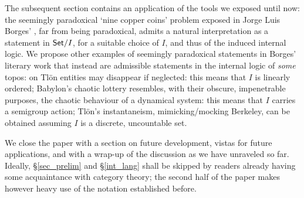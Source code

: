 The subsequent section contains an application of the tools we exposed until now: the seemingly paradoxical `nine copper coins' problem exposed in Jorge Luis Borges' \cite{Borges1963}, far from being paradoxical, admits a natural interpretation as a statement in $\mathsf{Set}/I$, for a suitable choice of $I$, and thus of the induced internal logic. We propose other examples of seemingly paradoxical statements in Borges' literary work that instead are admissible statements in the internal logic of \emph{some} topos: on Tl\"on entities may disappear if neglected: this means that $I$ is linearly ordered; Babylon's chaotic lottery resembles, with their obscure, impenetrable purposes, the chaotic behaviour of a dynamical system: this means that $I$ carries a semigroup action; Tl\"on's instantaneism, mimicking/mocking Berkeley, can be obtained assuming $I$ is a discrete, uncountable set.

We close the paper with a section on future development, vistas for future applications, and with a wrap-up of the discussion as we have unraveled so far. Ideally, §\ref{sec_prelim} and §\ref{int_lang} shall be skipped by readers already having some acquaintance with category theory; the second half of the paper makes however heavy use of the notation established before.